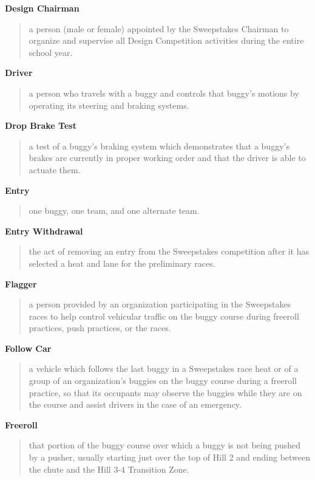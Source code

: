 \textbf{Design Chairman}
\begin{quote}
	a person (male or female) appointed by the Sweepstakes Chairman to organize and supervise all Design Competition activities during the entire school year.
\end{quote}

\textbf{Driver}
\begin{quote}
	a person who travels with a buggy and controls that buggy's motions by operating its steering and braking systems.
\end{quote}

\textbf{Drop Brake Test}
\begin{quote}
	a test of a buggy's braking system which demonstrates that a buggy's brakes are currently in proper working order and that the driver is able to actuate them.
\end{quote}

\textbf{Entry}
\begin{quote}
	one buggy, one team, and one alternate team.
\end{quote}

\textbf{Entry Withdrawal}
\begin{quote}
	the act of removing an entry from the Sweepstakes competition after it has selected a heat and lane for the preliminary races.
\end{quote}

\textbf{Flagger}
\begin{quote}
	a person provided by an organization participating in the Sweepstakes races to help control vehicular traffic on the buggy course during freeroll practices, push practices, or the races.
\end{quote}

\textbf{Follow Car}
\begin{quote}
	a vehicle which follows the last buggy in a Sweepstakes race heat or of a group of an organization's buggies on the buggy course during a freeroll practice, so that its occupants may observe the buggies while they are on the course and assist drivers in the case of an emergency.
\end{quote}

\textbf{Freeroll}
\begin{quote}
	that portion of the buggy course over which a buggy is not being pushed by a pusher, usually starting just over the top of Hill 2 and ending between the chute and the Hill 3-4 Transition Zone.
\end{quote}

